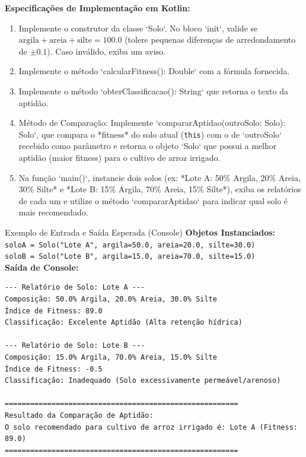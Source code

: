 \documentclass[12pt]{article}
\begin{document}
\vspace{0.2cm}
\noindent
\textbf{Especificações de Implementação em Kotlin:}
\begin{enumerate}[label=\alph*), leftmargin=1.5em]
  \item Implemente o construtor da classe `Solo`. No bloco `init`, valide se $\text{argila} + \text{areia} + \text{silte} = 100.0$ (tolere pequenas diferenças de arredondamento de $\pm 0.1$). Caso inválido, exiba um aviso.
  \item Implemente o método `calcularFitness(): Double` com a fórmula fornecida.
  \item Implemente o método `obterClassificacao(): String` que retorna o texto da aptidão.
  \item Método de Comparação: Implemente `compararAptidao(outroSolo: Solo): Solo`, que compara o *fitness* do solo atual (\texttt{this}) com o de `outroSolo` recebido como parâmetro e retorna o objeto `Solo` que possui a melhor aptidão (maior fitness) para o cultivo de arroz irrigado.
  \item Na função `main()`, instancie dois solos (ex: *Lote A: 50\% Argila, 20\% Areia, 30\% Silte* e *Lote B: 15\% Argila, 70\% Areia, 15\% Silte*), exiba os relatórios de cada um e utilize o método `compararAptidao` para indicar qual solo é mais recomendado.
\end{enumerate}

\vspace{0.2cm}
\begin{block}{Exemplo de Entrada e Saída Esperada (Console)}
\textbf{Objetos Instanciados:}\\
\texttt{soloA = Solo("Lote A", argila=50.0, areia=20.0, silte=30.0)}\\
\texttt{soloB = Solo("Lote B", argila=15.0, areia=70.0, silte=15.0)}\\
\textbf{Saída de Console:}
\begin{verbatim}
--- Relatório de Solo: Lote A ---
Composição: 50.0% Argila, 20.0% Areia, 30.0% Silte
Índice de Fitness: 89.0
Classificação: Excelente Aptidão (Alta retenção hídrica)

--- Relatório de Solo: Lote B ---
Composição: 15.0% Argila, 70.0% Areia, 15.0% Silte
Índice de Fitness: -0.5
Classificação: Inadequado (Solo excessivamente permeável/arenoso)

=======================================================
Resultado da Comparação de Aptidão:
O solo recomendado para cultivo de arroz irrigado é: Lote A (Fitness: 89.0)
=======================================================
\end{verbatim}
\end{block}

\end{document}
